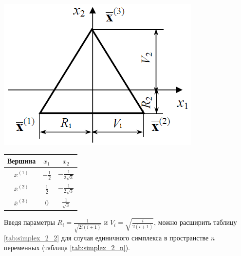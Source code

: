 \documentclass[a4paper,12pt]{report}
\begin{document}
\begin{enumerate}
\begin{minipage}{\textwidth}
  \begin{minipage}{0.49\textwidth}
    \centering
    \includegraphics[width=0.7\linewidth]{simplex_2.png}
    \label{fig:simplex_2}
  \end{minipage}
  \hfill
  \begin{minipage}{0.49\textwidth}
    \centering
    \captionsetup{justification=raggedleft}
    \label{tab:simplex_2_2}
    \begin{tabular}{|c|c|c|}
      \hline
      Вершина & $x_{1}$ & $x_{2}$\\
      \hline
      $\overline{x}^{(1)}$ & $-\frac{1}{2}$ & $-\frac{1}{2\sqrt{3}}$\\
      \hline
      $\overline{x}^{(2)}$ & $\frac{1}{2}$ & $-\frac{1}{2\sqrt{3}}$\\
      \hline
      $\overline{x}^{(3)}$ & 0 & $\frac{1}{\sqrt{3}}$\\
      \hline
    \end{tabular}
  \end{minipage}
\end{minipage}

Введя параметры $R_{i} = \frac{1}{\sqrt{2i(i+1)}}$ и $V_{i} = \sqrt{\frac{i}{2(i+1)}}$, можно расширить таблицу \ref{tab:simplex_2_2} для случая единичного симплекса в пространстве $n$ переменных (таблица \ref{tab:simplex_2_n}).


\end{enumerate}
\end{document}
